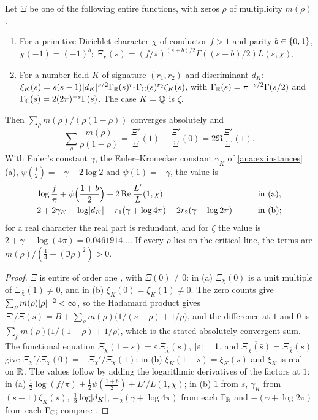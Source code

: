 \begin{lemma}\label{ana:lem:hadamardmass}
Let $\Xi$ be one of the following entire functions, with zeros $\rho$ of multiplicity $m(\rho)$.
\begin{enumerate}[label=\textup{(\alph*)}]
\item For a primitive Dirichlet character $\chi$ of conductor $f>1$ and parity $b\in\{0,1\}$,
 $\chi(-1)=(-1)^b$: $\Xi_\chi(s)=(f/\pi)^{(s+b)/2}\Gamma((s+b)/2)L(s,\chi)$.
\item For a number field $K$ of signature $(r_1,r_2)$ and discriminant $d_K$:
 $\xi_K(s)=s(s-1)\lvert d_K\rvert^{s/2}\Gamma_{\mathbb{R}}(s)^{r_1}\Gamma_{\mathbb{C}}(s)^{r_2}\zeta_K(s)$, with
 $\Gamma_{\mathbb{R}}(s)=\pi^{-s/2}\Gamma(s/2)$ and $\Gamma_{\mathbb{C}}(s)=2(2\pi)^{-s}\Gamma(s)$. The case $K=\mathbb{Q}$ is
 $\zeta$.
\end{enumerate}
Then $\sum_\rho m(\rho)/(\rho(1-\rho))$ converges absolutely and
\[
 \sum_\rho\frac{m(\rho)}{\rho(1-\rho)}=\frac{\Xi'}\Xi(1)-\frac{\Xi'}\Xi(0)=2\Re\frac{\Xi'}\Xi(1).
\]
With Euler's constant $\gamma$, the Euler--Kronecker constant $\gamma_K$ of
\cref{ana:ex:instances}(a), $\psi(\frac12)=-\gamma-2\log2$ and $\psi(1)=-\gamma$, the value is
\begin{alignat*}{2}
 &\log\frac f\pi+\psi\Bigl(\frac{1+b}2\Bigr)+2\operatorname{Re}\frac{L'}L(1,\chi)&\qquad&\text{in (a)},\\
 &2+2\gamma_K+\log\lvert d_K\rvert-r_1(\gamma+\log4\pi)-2r_2(\gamma+\log2\pi)&&\text{in (b)};
\end{alignat*}
for a real character the real part is redundant, and for $\zeta$ the value is
$2+\gamma-\log(4\pi)=0.0461914\ldots$. If every $\rho$ lies on the critical line, the terms are
$m(\rho)/(\frac14+(\Im\rho)^2)>0$.
\end{lemma}

\begin{proof}
$\Xi$ is entire of order one \cite{Davenport2000Multiplicative}, with $\Xi(0)\ne0$: in (a)
$\Xi_\chi(0)$ is a unit multiple of $\Xi_{\bar\chi}(1)\ne0$, and in (b) $\xi_K(0)=\xi_K(1)\ne0$. The
zero counts give $\sum_\rho m(\rho)\lvert\rho\rvert^{-2}<\infty$, so the Hadamard product gives
$\Xi'/\Xi(s)=B+\sum_\rho m(\rho)\bigl(1/(s-\rho)+1/\rho\bigr)$, and the difference at $1$ and $0$
is $\sum_\rho m(\rho)\bigl(1/(1-\rho)+1/\rho\bigr)$, which is the stated absolutely convergent sum.
The functional equation $\Xi_\chi(1-s)=\varepsilon\,\Xi_{\bar\chi}(s)$, $\lvert\varepsilon\rvert=1$, and
$\overline{\Xi_\chi(\bar s)}=\Xi_{\bar\chi}(s)$ give
$\Xi_\chi'/\Xi_\chi(0)=-\overline{\Xi_\chi'/\Xi_\chi(1)}$; in (b) $\xi_K(1-s)=\xi_K(s)$ and $\xi_K$
is real on $\mathbb{R}$. The values follow by adding the logarithmic derivatives of the factors at $1$:
in (a) $\frac12\log(f/\pi)+\frac12\psi(\frac{1+b}2)+L'/L(1,\chi)$; in (b) $1$ from $s$, $\gamma_K$
from $(s-1)\zeta_K(s)$, $\frac12\log\lvert d_K\rvert$, $-\frac12(\gamma+\log4\pi)$ from each $\Gamma_{\mathbb{R}}$ and
$-(\gamma+\log2\pi)$ from each $\Gamma_{\mathbb{C}}$; compare \cite[(1.2.2), (1.2.3), (1.3.11)]{IharaEulerKronecker}.
\end{proof}

